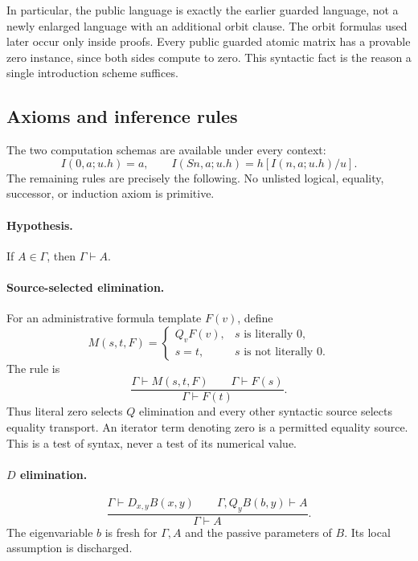 \documentclass[11pt,letterpaper]{article}
\theoremstyle{definition}\newtheorem{definition}[theorem]{Definition}
\theoremstyle{remark}\newtheorem{remark}[theorem]{Remark}
\begin{document}
In particular, the public language is exactly the earlier guarded language,
not a newly enlarged language with an additional orbit clause.
The orbit formulas used later occur only inside proofs. Every public guarded
atomic matrix has a provable zero instance, since both sides compute to zero.
This syntactic fact is the reason a single introduction scheme suffices.

\subsection{Axioms and inference rules}

The two computation schemas are available under every context:
\[
 I(0,a;u.h)=a,\qquad
 I(Sn,a;u.h)=h[I(n,a;u.h)/u].                       \tag{I0,IS}
\]
The remaining rules are precisely the following. No unlisted logical,
equality, successor, or induction axiom is primitive.

\paragraph{Hypothesis.}
If $A\in\Gamma$, then $\Gamma\vdash A$.

\paragraph{Source-selected elimination.}
For an administrative formula template $F(v)$, define
\[
 M(s,t,F)=
 \begin{cases}
 Q_vF(v),&s\text{ is literally }0,\\
 s=t,&s\text{ is not literally }0.
 \end{cases}
\]
The rule is
\[
 \frac{\Gamma\vdash M(s,t,F)\qquad\Gamma\vdash F(s)}
      {\Gamma\vdash F(t)}.                         \tag{E}
\]
Thus literal zero selects $Q$ elimination and every other syntactic source
selects equality transport. An iterator term denoting zero is a permitted
equality source. This is a test of syntax, never a test of its numerical value.

\paragraph{$D$ elimination.}
\[
 \frac{\Gamma\vdash D_{x,y}B(x,y)\qquad
       \Gamma,Q_yB(b,y)\vdash A}
      {\Gamma\vdash A}.                            \tag{DE}
\]
The eigenvariable $b$ is fresh for $\Gamma,A$ and the passive parameters of
$B$. Its local assumption is discharged.
\end{document}

